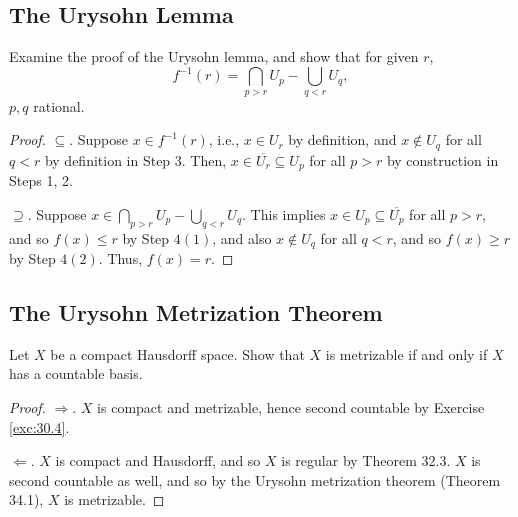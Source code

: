 \documentclass[12pt]{article}
\theoremstyle{remark}
\begin{document}
\subsection{The Urysohn Lemma}
\begin{problem}
  Examine the proof of the Urysohn lemma, and show that for given $r$,
  \begin{equation*}
    f^{-1}(r) = \bigcap_{p > r} U_p - \bigcup_{q < r} U_q,
  \end{equation*}
  $p,q$ rational.
\end{problem}
\begin{proof}
  $\subseteq$. Suppose $x \in f^{-1}(r)$, i.e., $x \in U_r$ by definition, and $x \notin U_q$ for all $q < r$ by definition in Step 3. Then, $x \in \overline{U_r} \subseteq U_p$ for all $p > r$ by construction in Steps 1, 2.
  \par $\supseteq$. Suppose $x \in \bigcap_{p > r} U_p - \bigcup_{q < r} U_q$. This implies $x \in U_p \subseteq \overline{U_p}$ for all $p > r$, and so $f(x) \le r$ by Step $4(1)$, and also $x \notin U_q$ for all $q < r$, and so $f(x) \ge r$ by Step $4(2)$. Thus, $f(x) = r$.
\end{proof}

\subsection{The Urysohn Metrization Theorem}
\setcounter{subsubsection}{2}
\begin{problem}
  Let $X$ be a compact Hausdorff space. Show that $X$ is metrizable if and only if $X$ has a countable basis.
\end{problem}
\begin{proof}
  $\Rightarrow$. $X$ is compact and metrizable, hence second countable
  by Exercise \ref{exc:30.4}.
  \par $\Leftarrow$. $X$ is compact and Hausdorff, and so $X$ is regular by Theorem $32.3$. $X$ is second countable as well, and so by the Urysohn metrization theorem (Theorem 34.1), $X$ is metrizable.
\end{proof}
\end{document}
